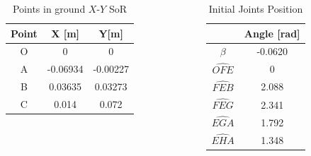 \documentclass[final]{beamer}
\newlength{\onecolwid}
\newlength{\twocolwid}
\begin{document}
\begin{frame}[t]
\begin{columns}[t]
\begin{column}{\twocolwid}
\begin{columns}[t, totalwidth=\twocolwid]
\begin{column}{\onecolwid}
\begin{columns}[t,totalwidth=\onecolwid]


\begin{column}{7.2in}
\begin{table}[h]
\begin{tabular}{ccc}
\toprule
Point & X {[}m{]} & Y{[}m{]} \\ 
\midrule
O     & 0         & 0        \\
A     & -0.06934  & -0.00227 \\
B     & 0.03635   & 0.03273  \\
C     & 0.014     & 0.072\\
\bottomrule
\end{tabular}

\caption{Points in ground $X$-$Y$ SoR}
\label{TAB:PointsInGround}
\end{table}
\end{column}


\begin{column}{7.2in}
\begin{table}[h]
\begin{tabular}{cc}
\toprule
 & Angle [rad] \\ 
\midrule
$\beta$     &-0.0620        \\
$\hat{OFE}$     &0        \\
$\hat{FEB}$     &2.088        \\
$\hat{FEG}$     &2.341        \\
$\hat{EGA}$     &1.792        \\
$\hat{EHA}$     &1.348        \\
\bottomrule
\end{tabular}

\caption{Initial Joints Position}
\label{TAB:InitialAngles}
\end{table}
\end{column}

\end{columns}







\end{column}
\end{columns}
\end{column}
\end{columns}
\end{frame}
\end{document}
